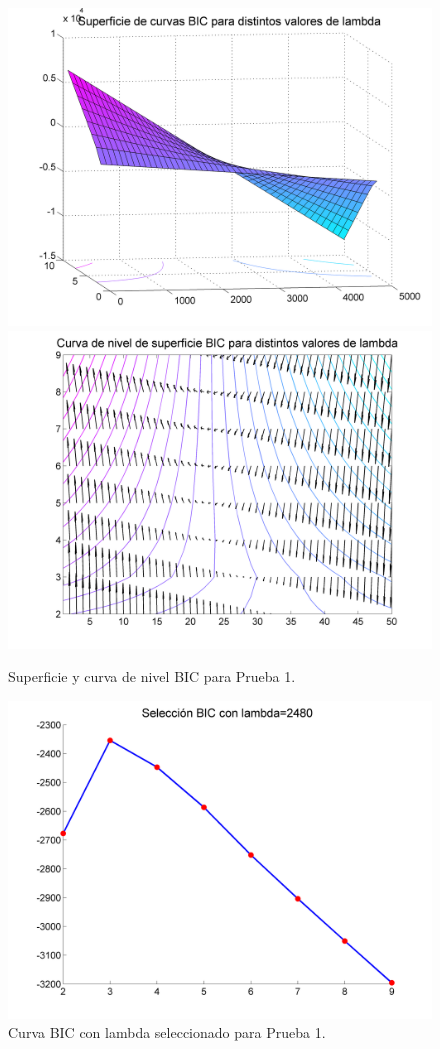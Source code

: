 \begin{figure}[bth]
  \centerline  
  {\includegraphics[width=0.8\linewidth]{gfx/chap6/cald20}
   \includegraphics[width=0.8\linewidth]{gfx/chap6/cald21}
  } \quad
  \caption{Superficie y curva de nivel BIC para Prueba 1.}
  \label{fig:prb1_sup}
\end{figure}

\begin{figure}[bth]
  \centerline
  {\includegraphics[width=0.8\linewidth]{gfx/chap6/cald11}} \quad
  \caption{Curva BIC con lambda seleccionado para Prueba 1.}
  \label{fig:prb1_curv}
\end{figure}

